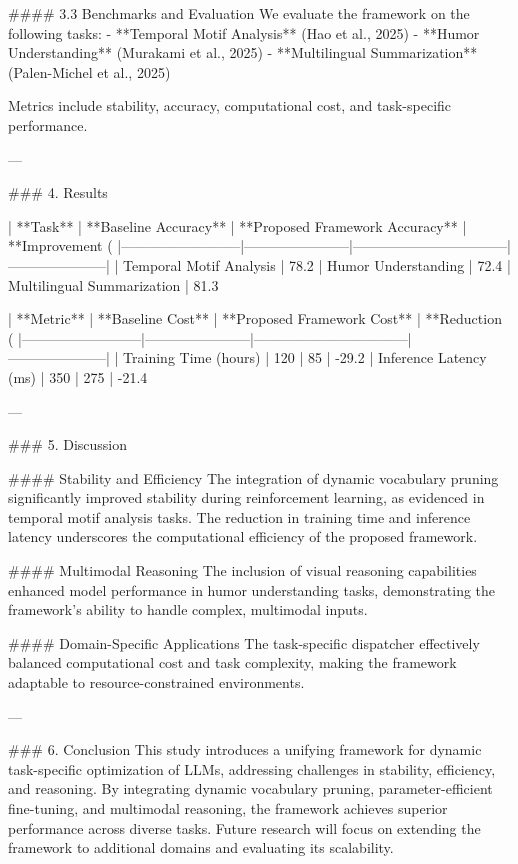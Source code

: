 #### 3.3 Benchmarks and Evaluation  
We evaluate the framework on the following tasks:  
- **Temporal Motif Analysis** (Hao et al., 2025)  
- **Humor Understanding** (Murakami et al., 2025)  
- **Multilingual Summarization** (Palen-Michel et al., 2025)  

Metrics include stability, accuracy, computational cost, and task-specific performance.

---

### 4. Results  

| **Task**                 | **Baseline Accuracy** | **Proposed Framework Accuracy** | **Improvement (%
|--------------------------|-----------------------|---------------------------------|---------------------|  
| Temporal Motif Analysis  | 78.2%
| Humor Understanding      | 72.4%
| Multilingual Summarization | 81.3%

| **Metric**               | **Baseline Cost**     | **Proposed Framework Cost**     | **Reduction (%
|--------------------------|-----------------------|---------------------------------|---------------------|  
| Training Time (hours)    | 120                  | 85                              | -29.2%
| Inference Latency (ms)   | 350                  | 275                             | -21.4%

---

### 5. Discussion  

#### Stability and Efficiency  
The integration of dynamic vocabulary pruning significantly improved stability during reinforcement learning, as evidenced in temporal motif analysis tasks. The reduction in training time and inference latency underscores the computational efficiency of the proposed framework.

#### Multimodal Reasoning  
The inclusion of visual reasoning capabilities enhanced model performance in humor understanding tasks, demonstrating the framework's ability to handle complex, multimodal inputs.

#### Domain-Specific Applications  
The task-specific dispatcher effectively balanced computational cost and task complexity, making the framework adaptable to resource-constrained environments.

---

### 6. Conclusion  
This study introduces a unifying framework for dynamic task-specific optimization of LLMs, addressing challenges in stability, efficiency, and reasoning. By integrating dynamic vocabulary pruning, parameter-efficient fine-tuning, and multimodal reasoning, the framework achieves superior performance across diverse tasks. Future research will focus on extending the framework to additional domains and evaluating its scalability.

